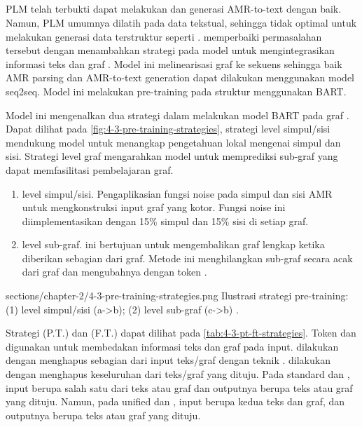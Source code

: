 \subsection{ }

\Gls{PLM} telah terbukti dapat melakukan  \amrparsing{} dan generasi AMR-to-text dengan baik.
Namun, \gls{PLM} umumnya dilatih pada data tekstual, sehingga tidak optimal untuk melakukan generasi data terstruktur seperti \AMR{}.
\textcite{bai2022} memperbaiki permasalahan tersebut dengan menambahkan strategi \pretraining{} pada model untuk mengintegrasikan informasi teks dan graf \AMR{}.
Model ini melinearisasi graf \AMR{} ke sekuens sehingga baik AMR parsing dan AMR-to-text generation dapat dilakukan menggunakan model \gls{seq2seq}.
Model ini melakukan pre-training pada struktur \AMR{} menggunakan \gls{BART}.


Model ini mengenalkan dua strategi  dalam melakukan \pretraining{} model \gls{BART} pada graf \AMR{}.
Dapat dilihat pada \cref{fig:4-3-pre-training-strategies}, strategi level \denoising{} simpul/sisi mendukung model untuk menangkap pengetahuan lokal mengenai simpul dan sisi.
Strategi \denoising{} level graf mengarahkan model untuk memprediksi sub-graf yang dapat memfasilitasi pembelajaran graf.
\begin{enumerate}
  \item \Denoising{} level simpul/sisi.
  Pengaplikasian fungsi noise pada simpul dan sisi AMR untuk mengkonstruksi input graf yang kotor.
  Fungsi noise ini diimplementasikan dengan  15\% simpul dan 15\% sisi di setiap graf.

  \item \Denoising{} level sub-graf.
   ini bertujuan untuk mengembalikan graf lengkap ketika diberikan sebagian dari graf.
  Metode ini menghilangkan sub-graf secara acak dari graf dan mengubahnya dengan token .
\end{enumerate}

  {sections/chapter-2/4-3-pre-training-strategies.png}
  {Ilustrasi strategi pre-training: (1) \denoising{} level simpul/sisi (a->b); (2) \denoising{} level sub-graf (c->b) .}

Strategi \pretraining{} (P.T.) dan \finetuning{} (F.T.) dapat dilihat pada \cref{tab:4-3-pt-ft-strategies}.
Token  dan  digunakan untuk membedakan informasi teks dan graf pada input.
\Pretraining{} dilakukan dengan menghapus sebagian dari input teks/graf dengan teknik \denoising{}.
\Finetuning{} dilakukan dengan menghapus keseluruhan dari teks/graf yang dituju.
Pada standard \pretraining{} dan \finetuning{}, input berupa salah satu dari teks atau graf dan outputnya berupa teks atau graf yang dituju.
Namun, pada unified \pretraining{} dan \finetuning{}, input berupa kedua teks dan graf, dan outputnya berupa teks atau graf yang dituju.

